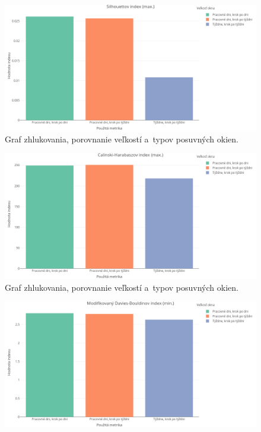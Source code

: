 \documentclass[a4paper,twoside,slovak,12pt,appendix]{article}
\begin{document}
\begin{appendices}
\begin{figure}[htbp]
  \centering
  \includegraphics[width=\textwidth]{cvi/window_comparison/201903072017-Sil-window_comparison.png}
  \caption{Graf zhlukovania, porovnanie veľkostí a~typov posuvných okien.}
\end{figure}
\begin{figure}[htbp]
  \centering
  \includegraphics[width=\textwidth]{cvi/window_comparison/201903072017-CH-window_comparison.png}
  \caption{Graf zhlukovania, porovnanie veľkostí a~typov posuvných okien.}
\end{figure}
\begin{figure}[htbp]
  \centering
  \includegraphics[width=\textwidth]{cvi/window_comparison/201903072017-DBstar-window_comparison.png}

\end{figure}
\end{appendices}
\end{document}
